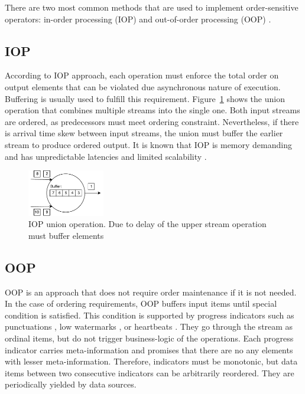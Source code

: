
\label {fs-typical}

There are two most common methods that are used to implement order-sensitive operators: in-order processing (IOP) \cite{Arasu:2006:CCQ:1146461.1146463, Cranor:2003:GSD:872757.872838, hammad2004optimizing} and out-of-order processing (OOP) \cite{Li:2008:OPN:1453856.1453890}.

\subsection{IOP}
According to IOP approach, each operation must enforce the total order on output elements that can be violated due asynchronous nature of execution. Buffering is usually used to fulfill this requirement. Figure~\ref{iop} shows the union operation that combines multiple streams into the single one. Both input streams are ordered, as predecessors must meet ordering constraint. Nevertheless, if there is arrival time skew between input streams, the union must buffer the earlier stream to produce ordered output. It is known that IOP is memory demanding and has unpredictable latencies and limited scalability \cite{Li:2008:OPN:1453856.1453890}.

\begin{figure}[htbp]
  \centering
  \includegraphics[width=0.30\textwidth]{pics/iop}
  \caption{IOP union operation. Due to delay of the upper stream operation must buffer elements}
  \label {iop}
\end{figure}

\subsection{OOP}

OOP is an approach that does not require order maintenance if it is not needed. In the case of ordering requirements, OOP buffers input items until special condition is satisfied. This condition is supported by progress indicators such as punctuations \cite{Tucker:2003:EPS:776752.776780}, low watermarks \cite{Akidau:2013:MFS:2536222.2536229}, or heartbeats \cite{Srivastava:2004:FTM:1055558.1055596}. They go through the stream as ordinal items, but do not trigger business-logic of the operations. Each progress indicator carries meta-information and promises that there are no any elements with lesser meta-information. Therefore, indicators must be monotonic, but data items between two consecutive indicators can be arbitrarily reordered. They are periodically yielded by data sources.

